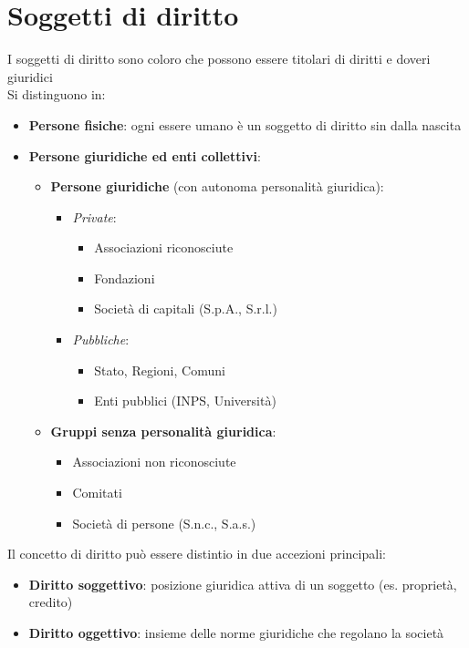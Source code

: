 \documentclass[8pt,oneside,a4paper]{article}
\begin{document}
	\section{Soggetti di diritto}
	I soggetti di diritto sono coloro che possono essere titolari di diritti e doveri giuridici\\	
	Si distinguono in:
	\begin{itemize}
		\item \textbf{Persone fisiche}: ogni essere umano è un soggetto di diritto sin dalla nascita	
		\item \textbf{Persone giuridiche ed enti collettivi}:
		\begin{itemize}
			\item \textbf{Persone giuridiche} (con autonoma personalità giuridica):
			\begin{itemize}
				\item \textit{Private}:
				\begin{itemize}
					\item Associazioni riconosciute
					\item Fondazioni
					\item Società di capitali (S.p.A., S.r.l.)
				\end{itemize}
				\item \textit{Pubbliche}:
				\begin{itemize}
					\item Stato, Regioni, Comuni
					\item Enti pubblici (INPS, Università)
				\end{itemize}
			\end{itemize}	
			\item \textbf{Gruppi senza personalità giuridica}:
			\begin{itemize}
				\item Associazioni non riconosciute
				\item Comitati
				\item Società di persone (S.n.c., S.a.s.)
			\end{itemize}
		\end{itemize}
	\end{itemize}	
	Il concetto di diritto può essere distintio in due accezioni principali:
	\begin{itemize}
		\item \textbf{Diritto soggettivo}: posizione giuridica attiva di un soggetto (es. proprietà, credito)
		\item \textbf{Diritto oggettivo}: insieme delle norme giuridiche che regolano la società
	\end{itemize}
\end{document}
